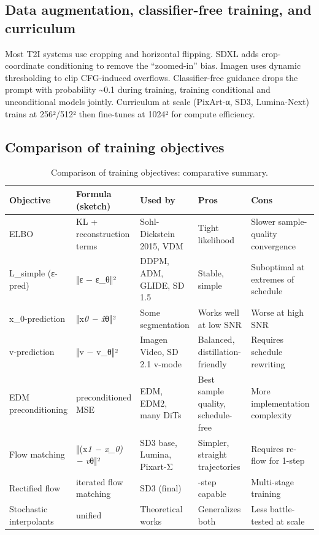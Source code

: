 \documentclass{article}
\begin{document}
\subsection{Data augmentation, classifier-free training, and curriculum}\label{data-augmentation-classifier-free-training-and-curriculum}

Most T2I systems use cropping and horizontal flipping. SDXL adds crop-coordinate conditioning to remove the ``zoomed-in'' bias. Imagen uses dynamic thresholding to clip CFG-induced overflows. Classifier-free guidance drops the prompt with probability \textasciitilde0.1 during training, training conditional and unconditional models jointly. Curriculum at scale (PixArt-α, SD3, Lumina-Next) trains at 256²/512² then fine-tunes at 1024² for compute efficiency.

\subsection{Comparison of training objectives}\label{comparison-of-training-objectives}

\begin{table}[t]
\centering
\caption{Comparison of training objectives: comparative summary.}
\label{tab:comparison-of-training-objectives}
\begin{tabular}{>{\raggedright\arraybackslash}p{0.1608\linewidth}
  >{\raggedright\arraybackslash}p{0.1748\linewidth}
  >{\raggedright\arraybackslash}p{0.1888\linewidth}
  >{\raggedright\arraybackslash}p{0.2378\linewidth}
  >{\raggedright\arraybackslash}p{0.2378\linewidth}}
\toprule
Objective & Formula (sketch) & Used by & Pros & Cons \\
\midrule
ELBO & KL + reconstruction terms & Sohl-Dickstein 2015, VDM & Tight likelihood & Slower sample-quality convergence \\
L\_simple (ε-pred) & ‖ε − ε\_θ‖² & DDPM, ADM, GLIDE, SD 1.5 & Stable, simple & Suboptimal at extremes of schedule \\
x\_0-prediction & ‖x\emph{0 − x̂}θ‖² & Some segmentation & Works well at low SNR & Worse at high SNR \\
v-prediction & ‖v − v\_θ‖² & Imagen Video, SD 2.1 v-mode & Balanced, distillation-friendly & Requires schedule rewriting \\
EDM preconditioning & preconditioned MSE & EDM, EDM2, many DiTs & Best sample quality, schedule-free & More implementation complexity \\
Flow matching & ‖(x\emph{1 − x\_0) − v}θ‖² & SD3 base, Lumina, Pixart-Σ & Simpler, straight trajectories & Requires re-flow for 1-step \\
Rectified flow & iterated flow matching & SD3 (final) & 1-step capable & Multi-stage training \\
Stochastic interpolants & unified & Theoretical works & Generalizes both & Less battle-tested at scale \\
\end{tabular}
\end{table}
\end{document}
